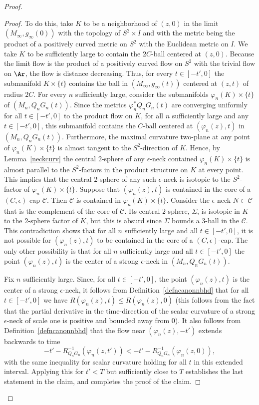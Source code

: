 \begin{proof}
\begin{proof}
To do this,  take $K$ to be a neighborhood of  $(z,0)$ in the limit
$(M_\infty,g_\infty(0))$ with the topology of $S^2\times I$ and with
the metric being the product of a positively curved metric on $S^2$
with the Euclidean metric on $I$. We take $K$ to be sufficiently
large to contain the $2C$-ball centered at $(z,0)$. Because the
limit flow is the product of a positively curved flow on $S^2$ with
the trivial flow on $\Ar$, the flow is distance decreasing. Thus,
for every $t\in [-t',0]$ the submanifold $K\times\{t\}$ contains the
ball in $(M_\infty,g_\infty(t))$ centered at $(z,t)$ of radius $2C$.
 For every $n$
sufficiently large, consider the submanifolds $\varphi_n(K)\times
\{t\}$ of $(M_n,Q_nG_n(t))$.  Since the metrics
$\varphi_n^*Q_nG_n(t)$ are converging uniformly for all $t\in
[-t',0]$ to the product flow on $K$, for all $n$ sufficiently large
and any $t\in [-t',0]$, this submanifold contains the $C$-ball
centered at $(\varphi_n(z),t)$ in $(M_n,Q_nG_n(t))$. Furthermore,
the maximal curvature two-plane at any point of
$\varphi_n(K)\times\{t\}$ is almost tangent to the $S^2$-direction
of $K$. Hence, by Lemma~\ref{neckcurv} the central $2$-sphere of any
$\epsilon$-neck contained $\varphi_n(K)\times\{t\}$ is almost
parallel to the $S^2$-factors in the product structure on $K$ at
every point. This implies that the central $2$-sphere of any such
$\epsilon$-neck is isotopic to the $S^2$-factor of
$\varphi_n(K)\times\{t\}$. Suppose that $(\varphi_n(z),t)$ is
contained in the core of a $(C,\epsilon)$-cap ${\mathcal C}$. Then
${\mathcal C}$ is contained in $\varphi_n(K)\times\{t\}$. Consider
the $\epsilon$-neck $N\subset {\mathcal C}$ that is the complement
of the core of ${\mathcal C}$. Its central $2$-sphere, $\Sigma$, is
isotopic in $K$ to the $2$-sphere factor of $K$, but this is absurd
since $\Sigma$ bounds a $3$-ball in the ${\mathcal C}$. This
contradiction shows that for all $n$ sufficiently large and all
$t\in [-t',0]$, it is not possible for $(\varphi_n(z),t)$ to be
contained in the core of a $(C,\epsilon)$-cap. The only other
possibility is that for all $n$ sufficiently large and all $t\in
[-t',0]$ the point $(\varphi_n(z),t)$ is the center of a strong
$\epsilon$-neck in $(M_n,Q_nG_n(t))$.

Fix $n$ sufficiently large. Since, for all $t\in [-t',0]$, the point
$(\varphi_n(z),t)$ is the center of a strong $\epsilon$-neck, it
follows from Definition~\ref{defncanonnbhd} that for all $t\in
[-t',0]$ we have $R(\varphi_n(z),t)\le R(\varphi_n(z),0)$ (this
follows from the fact that the partial derivative in the
time-direction of the scalar curvature of a strong $\epsilon$-neck
of scale one is positive and bounded away from $0$). It also follows
from Definition~\ref{defncanonnbhd} that the flow near
$(\varphi_n(z),-t')$ extends backwards to time
$$-t'-R^{-1}_{Q_nG_n}(\varphi_n(z,t'))<-t'-R^{-1}_{Q_nG_n}(\varphi_n(z,0)),$$
with the same inequality for scalar curvature holding for all $t$ in
this extended interval. Applying this for $t'<T$ but sufficiently
close to $T$ establishes the last statement in the claim, and
completes the proof of the claim.
\end{proof}


\end{proof}
